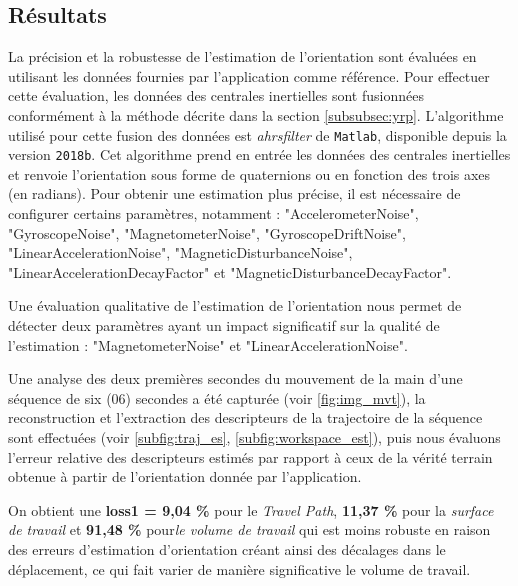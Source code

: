 \documentclass[5pt]{article}
\begin{document}
\subsection{Résultats}
La précision et la robustesse de l'estimation de l'orientation sont évaluées en utilisant les données fournies par l'application comme référence. Pour effectuer cette évaluation, les données des centrales inertielles sont fusionnées conformément à la méthode décrite dans la section \ref{subsubsec:yrp}. L'algorithme utilisé pour cette fusion des données est \textit{ahrsfilter} de \texttt{Matlab}, disponible depuis la version \texttt{2018b}. Cet algorithme prend en entrée les données des centrales inertielles et renvoie l'orientation sous forme de quaternions ou en fonction des trois axes (en radians). Pour obtenir une estimation plus précise, il est nécessaire de configurer certains paramètres, notamment : "AccelerometerNoise", "GyroscopeNoise", "MagnetometerNoise", "GyroscopeDriftNoise", "LinearAccelerationNoise", "MagneticDisturbanceNoise", "LinearAccelerationDecayFactor" et "MagneticDisturbanceDecayFactor". 

Une évaluation qualitative de l'estimation de l'orientation nous permet de détecter deux paramètres ayant un impact significatif sur la qualité de l'estimation : "MagnetometerNoise" et "LinearAccelerationNoise". 

Une analyse des deux premières secondes du mouvement de la main d'une séquence de six (06) secondes a été capturée (voir \ref{fig:img_mvt}), la reconstruction et l'extraction des descripteurs de la trajectoire de la séquence sont effectuées (voir \ref{subfig:traj_es}, \ref{subfig:workspace_est}), puis nous évaluons l'erreur relative des descripteurs estimés par rapport à ceux de la vérité terrain obtenue à partir de l'orientation donnée par l'application.

On obtient une \textbf{loss1 = 9,04 \%} pour le \textit{Travel Path}, \textbf{11,37 \%} pour la \textit{surface de travail} et \textbf{91,48 \%} pour\textit{le volume de travail} qui est moins robuste en raison des erreurs d'estimation d'orientation créant ainsi des décalages dans le déplacement, ce qui fait varier de manière significative le volume de travail.
\end{document}
